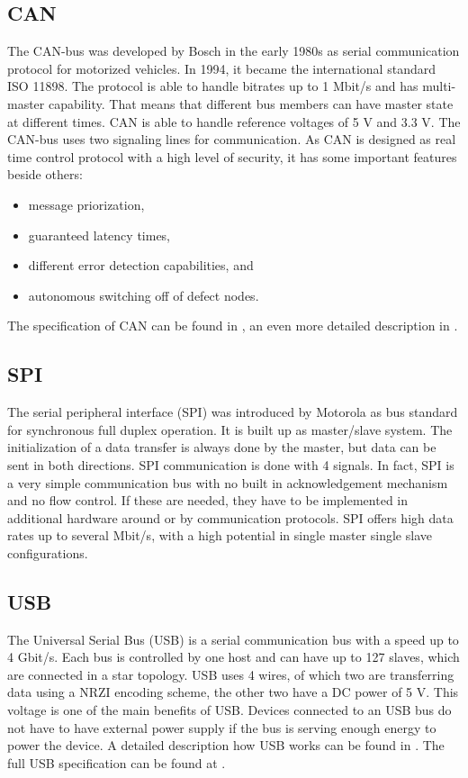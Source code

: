 \subsection{CAN}
The CAN-bus was developed by Bosch in the early 1980s as serial communication protocol for motorized vehicles. In 1994, it became the international standard ISO 11898. The protocol is able to handle bitrates up to 1 Mbit/s and has multi-master capability. That means that different bus members can have master state at different times. CAN is able to handle reference voltages of 5 V and 3.3 V.\cite{Corrig2008} The CAN-bus uses two signaling lines for communication. As CAN is designed as real time control protocol with a high level of security, it has some important features beside others\cite{boschcan91}:
\begin{itemize}
\item message priorization,
\item guaranteed latency times,
\item different error detection capabilities, and
\item autonomous switching off of defect nodes.
\end{itemize}
The specification of CAN can be found in \cite{boschcan91}, an even more detailed description in \cite{nxpcan98}.
\subsection {SPI}
The serial peripheral interface (SPI) was introduced by Motorola as bus standard for synchronous full duplex operation. It is built up as master/slave system. The initialization of a data transfer is always done by the master, but data can be sent in both directions. SPI communication is done with 4 signals. In fact, SPI is a very simple communication bus with no built in acknowledgement mechanism and no flow control. If these are needed, they have to be implemented in additional hardware around or by communication protocols. SPI offers high data rates up to several Mbit/s, with a high potential in single master single slave configurations.\cite{SPI02}
\subsection{USB}
The Universal Serial Bus (USB) is a serial communication bus with a speed up to 4 Gbit/s. Each bus is controlled by one host and can have up to 127 slaves, which are connected in a star topology. USB uses 4 wires, of which two are transferring data using a NRZI encoding scheme, the other two have a DC power of 5 V. This voltage is one of the main benefits of USB. Devices connected to an USB bus do not have to have external power supply if the bus is serving enough energy to power the device. A detailed description how USB works can be found in \cite{Pea10}. The full USB specification can be found at \cite{USB16}.
